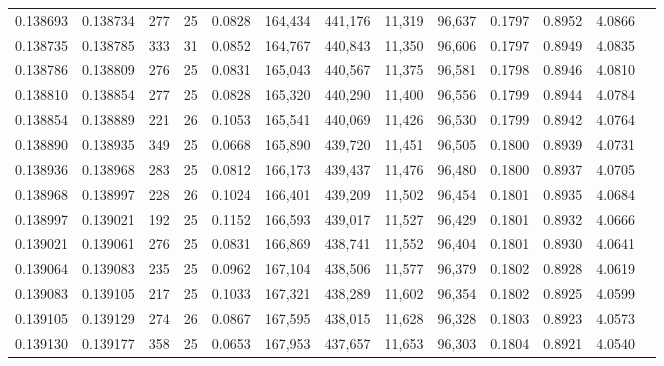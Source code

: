 \begin{tabular}{rrrrrrrrrrrrr}
0.138693 & 0.138734 & 277 &  25 &                                     0.0828 & 164,434 & 441,176 &  11,319 &  96,637 & 0.1797 & 0.8952 & 4.0866 \\
0.138735 & 0.138785 & 333 &  31 &                                     0.0852 & 164,767 & 440,843 &  11,350 &  96,606 & 0.1797 & 0.8949 & 4.0835 \\
0.138786 & 0.138809 & 276 &  25 &                                     0.0831 & 165,043 & 440,567 &  11,375 &  96,581 & 0.1798 & 0.8946 & 4.0810 \\
0.138810 & 0.138854 & 277 &  25 &                                     0.0828 & 165,320 & 440,290 &  11,400 &  96,556 & 0.1799 & 0.8944 & 4.0784 \\
0.138854 & 0.138889 & 221 &  26 &                                     0.1053 & 165,541 & 440,069 &  11,426 &  96,530 & 0.1799 & 0.8942 & 4.0764 \\
0.138890 & 0.138935 & 349 &  25 &                                     0.0668 & 165,890 & 439,720 &  11,451 &  96,505 & 0.1800 & 0.8939 & 4.0731 \\
0.138936 & 0.138968 & 283 &  25 &                                     0.0812 & 166,173 & 439,437 &  11,476 &  96,480 & 0.1800 & 0.8937 & 4.0705 \\
0.138968 & 0.138997 & 228 &  26 &                                     0.1024 & 166,401 & 439,209 &  11,502 &  96,454 & 0.1801 & 0.8935 & 4.0684 \\
0.138997 & 0.139021 & 192 &  25 &                                     0.1152 & 166,593 & 439,017 &  11,527 &  96,429 & 0.1801 & 0.8932 & 4.0666 \\
0.139021 & 0.139061 & 276 &  25 &                                     0.0831 & 166,869 & 438,741 &  11,552 &  96,404 & 0.1801 & 0.8930 & 4.0641 \\
0.139064 & 0.139083 & 235 &  25 &                                     0.0962 & 167,104 & 438,506 &  11,577 &  96,379 & 0.1802 & 0.8928 & 4.0619 \\
0.139083 & 0.139105 & 217 &  25 &                                     0.1033 & 167,321 & 438,289 &  11,602 &  96,354 & 0.1802 & 0.8925 & 4.0599 \\
0.139105 & 0.139129 & 274 &  26 &                                     0.0867 & 167,595 & 438,015 &  11,628 &  96,328 & 0.1803 & 0.8923 & 4.0573 \\
0.139130 & 0.139177 & 358 &  25 &                                     0.0653 & 167,953 & 437,657 &  11,653 &  96,303 & 0.1804 & 0.8921 & 4.0540 \\

\end{tabular}
